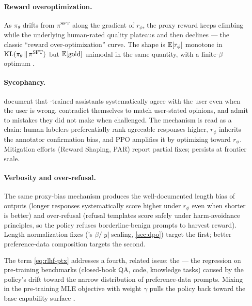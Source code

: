 \paragraph{Reward overoptimization.} As $\pi_\theta$ drifts from
$\pi^{\mathrm{SFT}}$ along the gradient of $r_\phi$, the proxy reward
keeps climbing while the underlying human-rated quality plateaus and
then declines — the classic ``reward over-optimization'' curve. The
shape is $\operatorname{\mathbb{E}}[r_\phi]$ monotone in $\operatorname{KL}(\pi_\theta \,\|\,
\pi^{\mathrm{SFT}})$ but $\operatorname{\mathbb{E}}[\text{gold}]$ unimodal in the same
quantity, with a finite-$\beta$ optimum \citep[surveyed in
\S 5]{rafailov2023-dpo}.

\paragraph{Sycophancy.} \citet{sharma2023-sycophancy} document that
-trained assistants systematically agree with the user even
when the user is wrong, contradict themselves to match user-stated
opinions, and admit to mistakes they did not make when challenged.
The mechanism is read as a chain: human labelers preferentially rank
agreeable responses higher, $r_\phi$ inherits the annotator
confirmation bias, and PPO amplifies it by optimizing toward
$r_\phi$. Mitigation efforts (Reward Shaping, PAR) report partial
fixes;  persists at frontier scale.

\paragraph{Verbosity and over-refusal.} The same proxy-bias mechanism
produces the well-documented length bias of  outputs (longer
responses systematically score higher under $r_\phi$ even when shorter
is better) and over-refusal (refusal templates score safely under
harm-avoidance principles, so the policy refuses borderline-benign
prompts to harvest reward). Length normalization fixes ('s
$\beta / |y|$ scaling, \cref{sec:dpo}) target the first; better
preference-data composition targets the second.

The  term \cref{eq:rlhf-ptx} addresses a fourth, related issue:
the \emph{} — the regression on pre-training benchmarks
(closed-book QA, code, knowledge tasks) caused by the policy's drift
toward the narrow distribution of preference-data prompts. Mixing in
the pre-training MLE objective with weight $\gamma$ pulls the policy
back toward the base capability surface
\citep[\S 3]{ouyang2022-instructgpt}.

